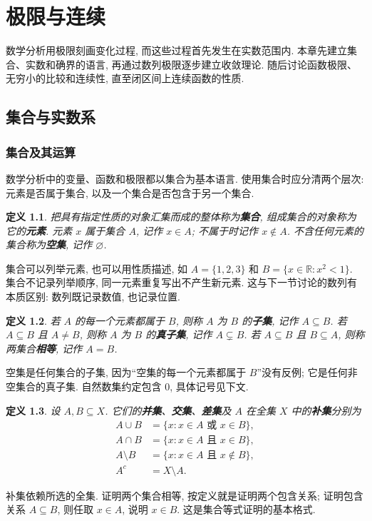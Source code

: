 \documentclass[UTF8,openany]{ctexbook}
\theoremstyle{chinesetextbook}
\newtheorem{definition}{定义}[section]
\begin{document}
\tableofcontents
\clearpage
\chapter{极限与连续}
数学分析用极限刻画变化过程, 而这些过程首先发生在实数范围内. 本章先建立集合、实数和确界的语言, 再通过数列极限逐步建立收敛理论. 随后讨论函数极限、无穷小的比较和连续性, 直至闭区间上连续函数的性质.
\section{集合与实数系}
\subsection{集合及其运算}
数学分析中的变量、函数和极限都以集合为基本语言. 使用集合时应分清两个层次: 元素是否属于集合, 以及一个集合是否包含于另一个集合.
\begin{definition}
把具有指定性质的对象汇集而成的整体称为\textbf{集合}, 组成集合的对象称为它的\textbf{元素}. 元素 $x$ 属于集合 $A$, 记作 $x\in A$; 不属于时记作 $x\notin A$. 不含任何元素的集合称为\textbf{空集}, 记作 $\varnothing$.
\end{definition}
集合可以列举元素, 也可以用性质描述, 如 $A=\{1,2,3\}$ 和 $B=\{x\in\mathbb R:x^2<1\}$. 集合不记录列举顺序, 同一元素重复写出不产生新元素. 这与下一节讨论的数列有本质区别: 数列既记录数值, 也记录位置.
\begin{definition}
若 $A$ 的每一个元素都属于 $B$, 则称 $A$ 为 $B$ 的\textbf{子集}, 记作 $A\subseteq B$. 若 $A\subseteq B$ 且 $A\ne B$, 则称 $A$ 为 $B$ 的\textbf{真子集}, 记作 $A\subsetneq B$. 若 $A\subseteq B$ 且 $B\subseteq A$, 则称两集合\textbf{相等}, 记作 $A=B$.
\end{definition}
空集是任何集合的子集, 因为“空集的每一个元素都属于 $B$”没有反例; 它是任何非空集合的真子集. 自然数集约定包含 $0$, 具体记号见下文.
\begin{definition}
设 $A,B\subseteq X$. 它们的\textbf{并集}、\textbf{交集}、\textbf{差集}及 $A$ 在全集 $X$ 中的\textbf{补集}分别为
\[
\begin{aligned}
A\cup B&=\{x:x\in A\text{ 或 }x\in B\},\\
A\cap B&=\{x:x\in A\text{ 且 }x\in B\},\\
A\setminus B&=\{x:x\in A\text{ 且 }x\notin B\},\\
A^c&=X\setminus A.
\end{aligned}
\]
\end{definition}
补集依赖所选的全集. 证明两个集合相等, 按定义就是证明两个包含关系; 证明包含关系 $A\subseteq B$, 则任取 $x\in A$, 说明 $x\in B$. 这是集合等式证明的基本格式.
\end{document}
